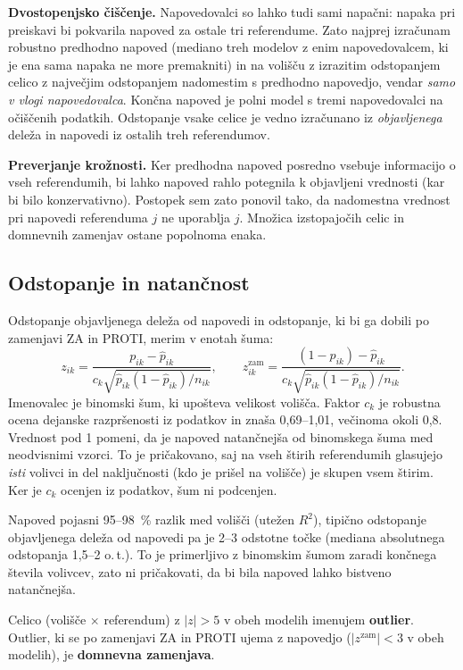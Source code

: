 \documentclass[11pt,a4paper]{article}
\begin{document}
\textbf{Dvostopenjsko čiščenje.} Napovedovalci so lahko tudi sami napačni: napaka pri preiskavi bi pokvarila napoved za ostale tri referendume. Zato najprej izračunam robustno predhodno napoved (mediano treh modelov z enim napovedovalcem, ki je ena sama napaka ne more premakniti) in na volišču z izrazitim odstopanjem celico z največjim odstopanjem nadomestim s predhodno napovedjo, vendar \emph{samo v vlogi napovedovalca}. Končna napoved je polni model s tremi napovedovalci na očiščenih podatkih. Odstopanje vsake celice je vedno izračunano iz \emph{objavljenega} deleža in napovedi iz ostalih treh referendumov.

\textbf{Preverjanje krožnosti.} Ker predhodna napoved posredno vsebuje informacijo o vseh referendumih, bi lahko napoved rahlo potegnila k objavljeni vrednosti (kar bi bilo konzervativno). Postopek sem zato ponovil tako, da nadomestna vrednost pri napovedi referenduma $j$ ne uporablja $j$. Množica izstopajočih celic in domnevnih zamenjav ostane popolnoma enaka.

\subsection{Odstopanje in natančnost}

Odstopanje objavljenega deleža od napovedi in odstopanje, ki bi ga dobili po zamenjavi ZA in PROTI, merim v enotah šuma:
\begin{equation}
z_{ik} = \frac{p_{ik}-\hat p_{ik}}{c_k\sqrt{\hat p_{ik}(1-\hat p_{ik})/n_{ik}}},\qquad
z^{\text{zam}}_{ik} = \frac{(1-p_{ik})-\hat p_{ik}}{c_k\sqrt{\hat p_{ik}(1-\hat p_{ik})/n_{ik}}}.
\label{eq:z}
\end{equation}
Imenovalec je binomski šum, ki upošteva velikost volišča. Faktor $c_k$ je robustna ocena dejanske razpršenosti iz podatkov in znaša 0,69--1,01, večinoma okoli 0,8. Vrednost pod 1 pomeni, da je napoved natančnejša od binomskega šuma med neodvisnimi vzorci. To je pričakovano, saj na vseh štirih referendumih glasujejo \emph{isti} volivci in del naključnosti (kdo je prišel na volišče) je skupen vsem štirim. Ker je $c_k$ ocenjen iz podatkov, šum ni podcenjen.

Napoved pojasni 95--98~\% razlik med volišči (utežen $R^2$), tipično odstopanje objavljenega deleža od napovedi pa je 2--3 odstotne točke (mediana absolutnega odstopanja 1,5--2 o.\,t.). To je primerljivo z binomskim šumom zaradi končnega števila volivcev, zato ni pričakovati, da bi bila napoved lahko bistveno natančnejša.

Celico (volišče $\times$ referendum) z $|z|>5$ v obeh modelih imenujem \textbf{outlier}. Outlier, ki se po zamenjavi ZA in PROTI ujema z napovedjo ($|z^{\text{zam}}|<3$ v obeh modelih), je \textbf{domnevna zamenjava}.
\end{document}
